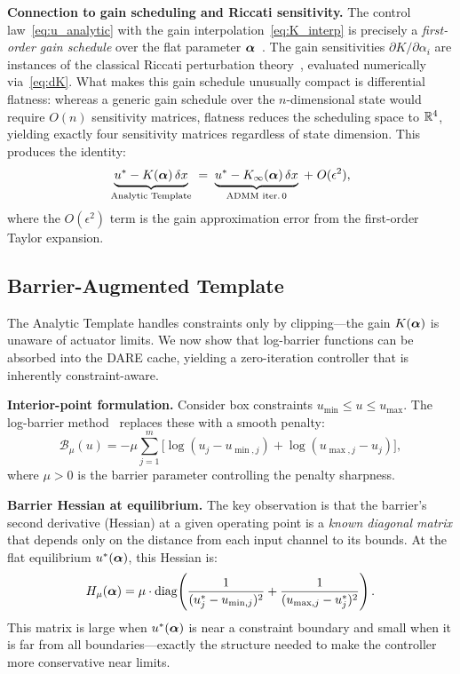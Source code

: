 \textbf{Connection to gain scheduling and Riccati sensitivity.}
The control law~\eqref{eq:u_analytic} with the gain
interpolation~\eqref{eq:K_interp} is precisely a
\emph{first-order gain schedule} over the flat parameter
$\bm{\alpha}$~\cite{rugh2000}.
The gain sensitivities $\partial K / \partial \alpha_i$ are instances
of the classical Riccati perturbation theory~\cite{hewer1971,konstantinov1993},
evaluated numerically via~\eqref{eq:dK}.
What makes this gain schedule unusually compact is
differential flatness: whereas a generic gain schedule over the
$n$-dimensional state would require $O(n)$ sensitivity matrices,
flatness reduces the scheduling space to $\mathbb{R}^4$, yielding
exactly four sensitivity matrices regardless of state dimension.
This produces the identity:
\begin{equation}\label{eq:chain}
  \underbrace{u^* - K(\bm{\alpha})\,\delta x}_{\text{Analytic Template}}
  \;=\;
  \underbrace{u^* - K_\infty(\bm{\alpha})\,\delta x}_{\text{ADMM iter.\,0}}
  \;+\; O(\epsilon^2),
\end{equation}
where the $O(\epsilon^2)$ term is the gain approximation
error from the first-order Taylor expansion.

\subsection{Barrier-Augmented Template}\label{sec:barrier}

The Analytic Template handles constraints only by
clipping---the gain $K(\bm{\alpha})$ is unaware of actuator limits.
We now show that log-barrier functions can be absorbed into
the DARE cache, yielding a zero-iteration controller that is
inherently constraint-aware.

\textbf{Interior-point formulation.}
Consider box constraints $u_{\min} \leq u \leq u_{\max}$.
The log-barrier method~\cite{boyd2004,jordana2023}
replaces these with a smooth penalty:
\begin{equation}\label{eq:barrier}
  \mathcal{B}_\mu(u) = -\mu \sum_{j=1}^{m}
    \bigl[\log(u_j - u_{\min,j})
          + \log(u_{\max,j} - u_j)\bigr],
\end{equation}
where $\mu > 0$ is the barrier parameter controlling the
penalty sharpness.

\textbf{Barrier Hessian at equilibrium.}
The key observation is that the barrier's second derivative
(Hessian) at a given operating point is a \emph{known diagonal
matrix} that depends only on the distance from each input
channel to its bounds.
At the flat equilibrium $u^*(\bm{\alpha})$, this Hessian is:
\begin{equation}\label{eq:barrier_hess}
  H_\mu(\bm{\alpha}) = \mu \cdot \mathrm{diag}\!\left(
    \frac{1}{(u^*_j - u_{\min,j})^2}
    + \frac{1}{(u_{\max,j} - u^*_j)^2}
  \right).
\end{equation}
This matrix is large when $u^*(\bm{\alpha})$ is near a
constraint boundary and small when it is far from all
boundaries---exactly the structure needed to make the
controller more conservative near limits.

